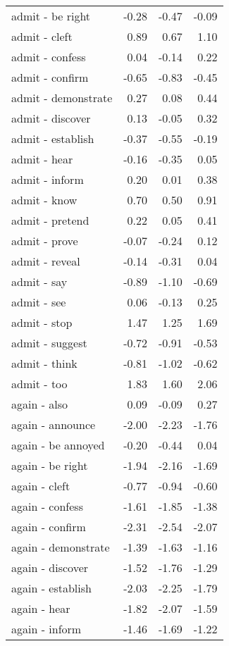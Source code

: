 \begin{longtable}{lrrr}
  admit - be right & -0.28 & -0.47 & -0.09 \\ 
  admit - cleft & 0.89 & 0.67 & 1.10 \\ 
  admit - confess & 0.04 & -0.14 & 0.22 \\ 
  admit - confirm & -0.65 & -0.83 & -0.45 \\ 
  admit - demonstrate & 0.27 & 0.08 & 0.44 \\ 
  admit - discover & 0.13 & -0.05 & 0.32 \\ 
  admit - establish & -0.37 & -0.55 & -0.19 \\ 
  admit - hear & -0.16 & -0.35 & 0.05 \\ 
  admit - inform & 0.20 & 0.01 & 0.38 \\ 
  admit - know & 0.70 & 0.50 & 0.91 \\ 
  admit - pretend & 0.22 & 0.05 & 0.41 \\ 
  admit - prove & -0.07 & -0.24 & 0.12 \\ 
  admit - reveal & -0.14 & -0.31 & 0.04 \\ 
  admit - say & -0.89 & -1.10 & -0.69 \\ 
  admit - see & 0.06 & -0.13 & 0.25 \\ 
  admit - stop & 1.47 & 1.25 & 1.69 \\ 
  admit - suggest & -0.72 & -0.91 & -0.53 \\ 
  admit - think & -0.81 & -1.02 & -0.62 \\ 
  admit - too & 1.83 & 1.60 & 2.06 \\ 
  again - also & 0.09 & -0.09 & 0.27 \\ 
  again - announce & -2.00 & -2.23 & -1.76 \\ 
  again - be annoyed & -0.20 & -0.44 & 0.04 \\ 
  again - be right & -1.94 & -2.16 & -1.69 \\ 
  again - cleft & -0.77 & -0.94 & -0.60 \\ 
  again - confess & -1.61 & -1.85 & -1.38 \\ 
  again - confirm & -2.31 & -2.54 & -2.07 \\ 
  again - demonstrate & -1.39 & -1.63 & -1.16 \\ 
  again - discover & -1.52 & -1.76 & -1.29 \\ 
  again - establish & -2.03 & -2.25 & -1.79 \\ 
  again - hear & -1.82 & -2.07 & -1.59 \\ 
  again - inform & -1.46 & -1.69 & -1.22 \\ 

\end{longtable}
